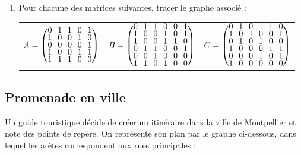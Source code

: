\documentclass[oneside,12pt]{book}          %
\begin{document}
\begin{enumerate}
\newpage

    \item Pour chacune des matrices suivantes, tracer le graphe associé : \\[10pt]
    \begin{tabular}{p{} p{} p{}}
        $A=\matrice{0&1&1&0&1\\1&0&0&1&0\\0&0&0&0&1\\1&0&0&1&1\\1&1&1&0&0} $ &
        $B=\matrice{0&1&1&0&0&1\\1&0&0&1&0&1\\1&0&0&1&1&0\\0&1&1&0&0&1\\0&0&1&0&0&0\\1&1&0&1&0&0} $ &
        $C=\matrice{0&1&0&1&1&0\\1&0&1&0&0&1\\0&1&0&1&0&0\\1&0&0&0&1&1\\0&0&0&1&0&1\\1&0&0&0&0&0} $
    \end{tabular}
\end{enumerate}



\subsection{Promenade en ville}
Un guide touristique décide de créer un itinéraire dans la ville de Montpellier et note des points de repère. On représente son plan par le graphe ci-dessous, dans lequel les arêtes correspondent aux  rues principales : \\[5pt]
\end{document}
